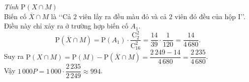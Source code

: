 \begin{ex}
{		\textit{Tính $\mathrm{P}\left(X \cap M\right)$} \\
		Biến cố $\overline{X} \cap M$ là \lq\lq Cả $2$ viên lấy ra đều màu đỏ và cả $2$ viên đó đều của hộp I\rq\rq.\\ 
		Điều này chỉ xảy ra ở trường hợp biến cố $A_1$.
		\[ \mathrm{P}\left(\overline{X} \cap M\right) = \mathrm{P}\left(A_1\right) \cdot \dfrac{\mathrm{C}_2^2}{\mathrm{C}_{16}^2} = \dfrac{14}{39} \cdot \dfrac{1}{120} = \dfrac{14}{4\,680}.\]
		Suy ra $\mathrm{P}\left(X \cap M\right) = \mathrm{P}\left(M\right) - \mathrm{P}\left(\overline{X} \cap M\right) = \dfrac{2\,249 - 14}{4\,680} = \dfrac{2\,235}{4\,680}$.\\
		Vậy $1\,000P = 1\,000 \cdot \dfrac{2\,235}{2\,249} \approx 994$.
		
	}
\end{ex}

